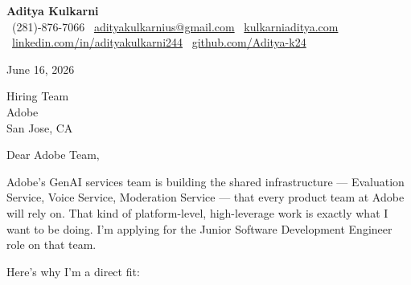 \documentclass[11pt]{article}
\begin{document}
\begin{center}
  {\LARGE \textbf{Aditya Kulkarni}} \\[4pt]
  \small
  \faPhone\ (281)-876-7066 \quad
  \faEnvelope\ \href{mailto:adityakulkarnius@gmail.com}{adityakulkarnius@gmail.com} \quad
  \faGlobe\ \href{https://www.kulkarniaditya.com}{kulkarniaditya.com} \quad
  \faLinkedin\ \href{https://www.linkedin.com/in/adityakulkarni244/}{linkedin.com/in/adityakulkarni244} \quad
  \faGithub\ \href{https://github.com/Aditya-k24}{github.com/Aditya-k24}
\end{center}

\vspace{6pt}

June 16, 2026

\vspace{6pt}

Hiring Team \\
Adobe \\
San Jose, CA

\vspace{10pt}

Dear Adobe Team,

\vspace{6pt}

Adobe's GenAI services team is building the shared infrastructure — Evaluation Service, Voice Service, Moderation Service — that every product team at Adobe will rely on. That kind of platform-level, high-leverage work is exactly what I want to be doing. I'm applying for the Junior Software Development Engineer role on that team.

\vspace{8pt}

Here's why I'm a direct fit:
\end{document}
